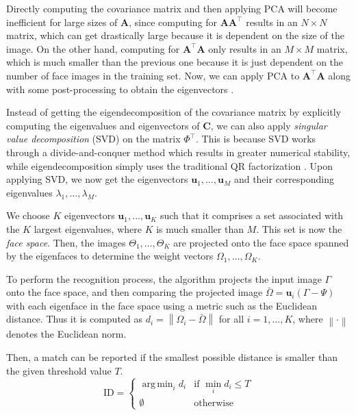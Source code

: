 Directly computing the covariance matrix and then applying PCA will become inefficient for large sizes of $\mathbf{A}$, since computing for $\mathbf{A}\mathbf{A}^\top$ results in an $N \times N$ matrix, which can get drastically large because it is dependent on the size of the image. On the other hand, computing for $\mathbf{A}^\top\mathbf{A}$ only results in an $M \times M$ matrix, which is much smaller than the previous one because it is just dependent on the number of face images in the training set. Now, we can apply PCA to $\mathbf{A}^\top\mathbf{A}$ along with some post-processing to obtain the eigenvectors \cite{hutchison_privacy-preserving_2009}. 

Instead of getting the eigendecomposition of the covariance matrix by explicitly computing the eigenvalues and eigenvectors of $\mathbf{C}$, we can also apply \textit{singular value decomposition} (SVD) on the matrix $\Phi^\top$. This is because SVD works through a divide-and-conquer method which results in greater numerical stability, while eigendecomposition simply uses the traditional QR factorization \cite{nakatsukasa_stable_2013, gu_divide-and-conquer_1995}. Upon applying SVD, we now get the eigenvectors $\mathbf{u}_1, \ldots, \mathbf{u}_M$ and their corresponding eigenvalues $\lambda_1, \ldots, \lambda_M$.

We choose $K$ eigenvectors $\mathbf{u}_1, \ldots, \mathbf{u}_K$ such that it comprises a set associated with the $K$ largest eigenvalues, where $K$ is much smaller than $M$. This set is now the \textit{face space}. Then, the images $\Theta_1, \ldots, \Theta_K$ are projected onto the face space spanned by the eigenfaces to determine the weight vectors $\Omega_1, \ldots, \Omega_K$.

To perform the recognition process, the algorithm projects the input image $\Gamma$ onto the face space, and then comparing the projected image $\bar{\Omega} = \mathbf{u}_i\left(\Gamma - \Psi\right)$ with each eigenface in the face space using a metric such as the Euclidean distance. Thus it is computed as $d_i = \left\lVert \Omega_i -\bar{\Omega} \right\rVert$ for all $i=1,\ldots,K$, where $\left\lVert \cdot \right\rVert$ denotes the Euclidean norm.

Then, a match can be reported if the smallest possible distance is smaller than the given threshold value $T$. 
\newcommand{\argmin}{\mathop{\mathrm{arg\,min}}}  
\[\text{ID} = \begin{cases}\argmin_i d_i & \text{if } \min_i d_i \le T \\\emptyset & \text {otherwise}\end{cases}
\]

